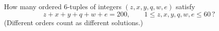 How many ordered $6$-tuples of integers $(z,x,y,q,w,e)$ satisfy
\[
z+x+y+q+w+e=200,\qquad 1\le z,x,y,q,w,e\le60\,?
\]
(Different orders count as different solutions.)
